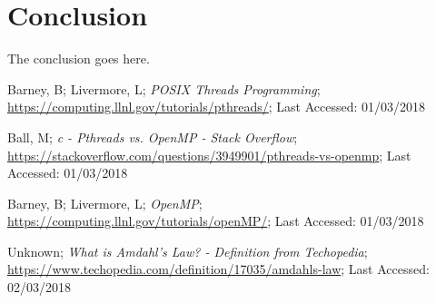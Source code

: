\documentclass[10pt, conference]{IEEEtran}
\begin{document}
\section{Conclusion}
\label{Conclusion}
The conclusion goes here.


\begin{thebibliography}{}

Barney, B; Livermore, L; \emph{POSIX Threads Programming}; \url{https://computing.llnl.gov/tutorials/pthreads/}; Last Accessed: 01/03/2018

Ball, M; \emph{c - Pthreads vs. OpenMP - Stack Overflow}; \url{https://stackoverflow.com/questions/3949901/pthreads-vs-openmp}; Last Accessed: 01/03/2018

Barney, B; Livermore, L; \emph{OpenMP}; \url{https://computing.llnl.gov/tutorials/openMP/}; Last Accessed: 01/03/2018

Unknown; \emph{What is Amdahl's Law? - Definition from Techopedia}; \url{https://www.techopedia.com/definition/17035/amdahls-law}; Last Accessed: 02/03/2018

\end{thebibliography}




\end{document}
